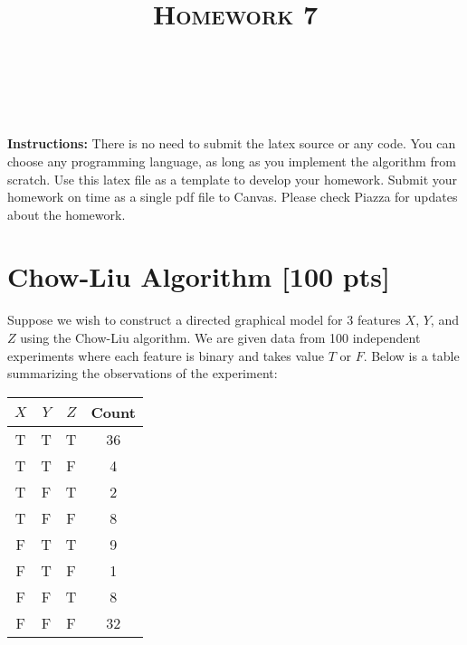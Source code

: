 \documentclass[a4paper]{article}
\title{\textsc{Homework 7}} %
\author{
\red{Daniel Szabo} \\
\red{9074762189}\\
}
\date{}
\theoremstyle{definition}
\begin{document}
\maketitle 


\textbf{Instructions:} 
There is no need to submit the latex source or any code.
You can choose any programming language, as long as you implement the algorithm from scratch. Use this latex file as a template to develop your homework.
Submit your homework on time as a single pdf file to Canvas.
Please check Piazza for updates about the homework.\\

\section{Chow-Liu Algorithm [100 pts]}
Suppose we wish to construct a directed graphical model for 3 features $X$, $Y$, and $Z$ using the Chow-Liu algorithm. We are given data from 100 independent experiments where each feature is binary and takes value $T$ or $F$. Below is a table summarizing the observations of the experiment:

\begin{table}[H]
        \centering
                \begin{tabular}{cccc}
                           $X$ & $Y$ & $Z$ & Count \\
                                \hline
                                T & T & T & 36 \\
                                \hline
                                T & T & F & 4 \\
                                \hline
                                T & F & T & 2 \\
                                \hline
                                T & F & F & 8 \\
                                \hline
                                F & T & T & 9 \\
                                \hline
                                F & T & F & 1 \\
                                \hline
                                F & F & T & 8 \\
                                \hline
                                F & F & F & 32 \\
                                \hline
                \end{tabular}
\end{table}
\end{document}
